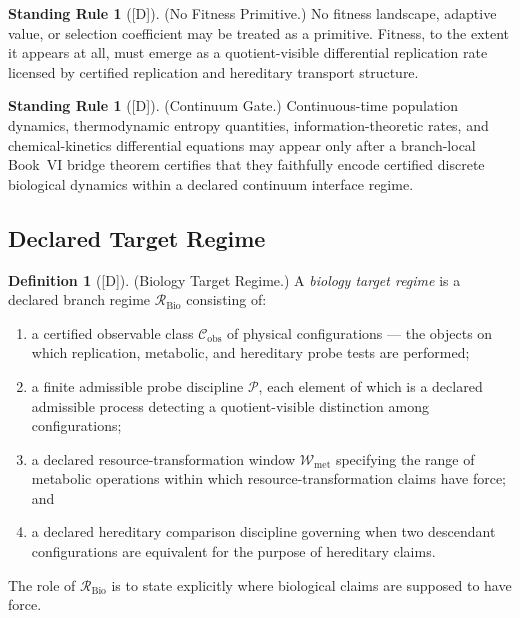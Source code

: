 \documentclass[12pt,oneside]{amsbook}
\theoremstyle{plain}
\theoremstyle{definition}
\newtheorem{definition}[theorem]{Definition}
\newtheorem{standingrule}[theorem]{Standing Rule}
\theoremstyle{remark}
\newcommand{\status}[1]{\textup{[#1]}}
\begin{document}
\begin{standingrule}[\status{D}]\label{sr:bio-no-fitness-primitive}
\textup{(No Fitness Primitive.)}
No fitness landscape, adaptive value, or selection coefficient may be
treated as a primitive. Fitness, to the extent it appears at all,
must emerge as a quotient-visible differential replication rate
licensed by certified replication and hereditary transport structure.
\end{standingrule}

\begin{standingrule}[\status{D}]\label{sr:bio-continuum-gate}
\textup{(Continuum Gate.)}
Continuous-time population dynamics, thermodynamic entropy quantities,
information-theoretic rates, and chemical-kinetics differential
equations may appear only after a branch-local Book~VI bridge theorem
certifies that they faithfully encode certified discrete biological
dynamics within a declared continuum interface regime.
\end{standingrule}

\subsection{Declared Target Regime}\label{sec:bio-target-regime}

\begin{definition}[\status{D}]\label{def:bio-target-regime}
\textup{(Biology Target Regime.)}
A \emph{biology target regime} is a declared branch regime
$\mathcal{R}_{\mathrm{Bio}}$ consisting of:
\begin{enumerate}[label=\textup{(\arabic*)}]
 \item a certified observable class $\mathcal{C}_{\mathrm{obs}}$ of
 physical configurations --- the objects on which replication,
 metabolic, and hereditary probe tests are performed;
 \item a finite admissible probe discipline $\mathcal{P}$, each element
 of which is a declared admissible process detecting a
 quotient-visible distinction among configurations;
 \item a declared resource-transformation window $\mathcal{W}_{\mathrm{met}}$
 specifying the range of metabolic operations within which
 resource-transformation claims have force; and
 \item a declared hereditary comparison discipline governing when two
 descendant configurations are equivalent for the purpose of
 hereditary claims.
\end{enumerate}
The role of $\mathcal{R}_{\mathrm{Bio}}$ is to state explicitly where
biological claims are supposed to have force.
\end{definition}
\end{document}
